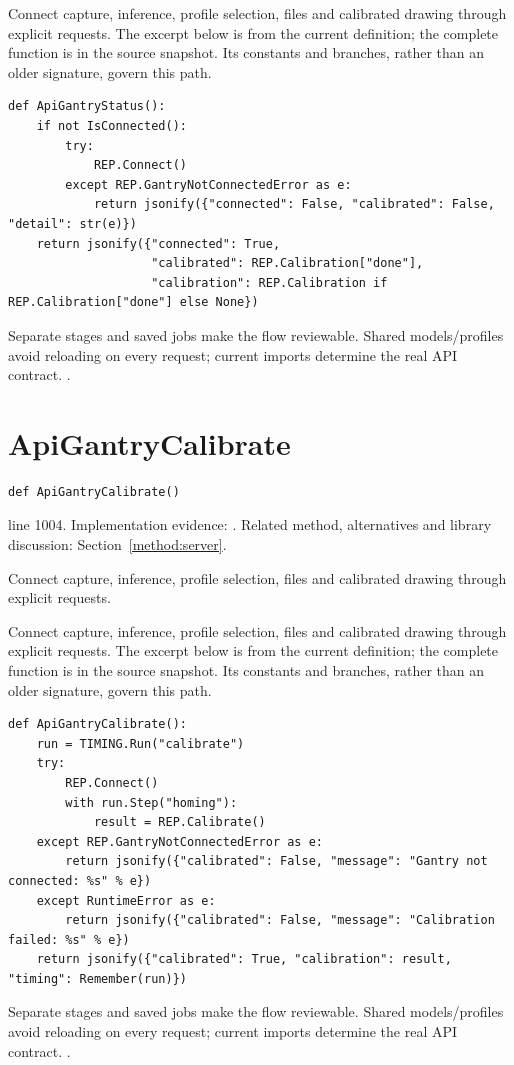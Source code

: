 Connect capture, inference, profile selection, files and calibrated drawing through explicit requests. The excerpt below is from the current definition; the complete function is in the source snapshot. Its constants and branches, rather than an older signature, govern this path.


\begin{lstlisting}[style=plain]
def ApiGantryStatus():
    if not IsConnected():
        try:
            REP.Connect()
        except REP.GantryNotConnectedError as e:
            return jsonify({"connected": False, "calibrated": False, "detail": str(e)})
    return jsonify({"connected": True,
                    "calibrated": REP.Calibration["done"],
                    "calibration": REP.Calibration if REP.Calibration["done"] else None})
\end{lstlisting}
Separate stages and saved jobs make the flow reviewable. Shared models/profiles avoid reloading on every request; current imports determine the real API contract. \cite{flaskdocs,pillowops,code2026}.


\section{ApiGantryCalibrate}\label{fn:web-server:ApiGantryCalibrate}
\begin{lstlisting}[style=sig]
def ApiGantryCalibrate()
\end{lstlisting}
 line 1004. Implementation evidence: \cite{code2026}. Related method, alternatives and library discussion: Section~\ref{method:server}.


Connect capture, inference, profile selection, files and calibrated drawing through explicit requests.


Connect capture, inference, profile selection, files and calibrated drawing through explicit requests. The excerpt below is from the current definition; the complete function is in the source snapshot. Its constants and branches, rather than an older signature, govern this path.


\begin{lstlisting}[style=plain]
def ApiGantryCalibrate():
    run = TIMING.Run("calibrate")
    try:
        REP.Connect()
        with run.Step("homing"):
            result = REP.Calibrate()
    except REP.GantryNotConnectedError as e:
        return jsonify({"calibrated": False, "message": "Gantry not connected: %s" % e})
    except RuntimeError as e:
        return jsonify({"calibrated": False, "message": "Calibration failed: %s" % e})
    return jsonify({"calibrated": True, "calibration": result, "timing": Remember(run)})
\end{lstlisting}
Separate stages and saved jobs make the flow reviewable. Shared models/profiles avoid reloading on every request; current imports determine the real API contract. \cite{flaskdocs,pillowops,code2026}.


